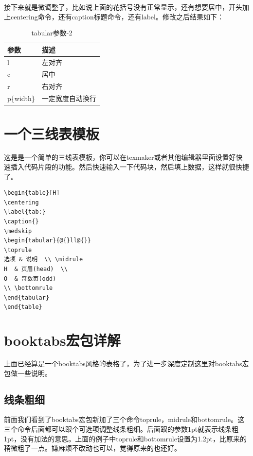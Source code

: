 \documentclass[11pt,oneside]{book}
\begin{document}
接下来就是微调整了，比如说上面的花括号没有正常显示，还有想要居中，开头加上centering命令，还有caption标题命令，还有label。修改之后结果如下：
\begin{table}[H]
\centering
\begin{tabular}{@{}ll@{}}
\toprule[1.2pt]
参数       & 描述       \\ \midrule
l        & 左对齐      \\
c        & 居中       \\
r        & 右对齐      \\
p\{width\} & 一定宽度自动换行 \\ \bottomrule[1.2pt]
\end{tabular}
\caption{tabular参数-2}
\label{tab:tabular参数-2}
\end{table}

\section{一个三线表模板}
这是是一个简单的三线表模板，你可以在texmaker或者其他编辑器里面设置好快速插入代码片段的功能。然后快速输入一下代码块，然后填上数据，这样就很快捷了。
\begin{Verbatim}
\begin{table}[H]
\centering
\label{tab:}
\caption{}
\medskip 
\begin{tabular}{@{}ll@{}}
\toprule
选项 & 说明  \\ \midrule
H  & 页眉(head)  \\
O  & 奇数页(odd) 
\\ \bottomrule
\end{tabular}
\end{table}
\end{Verbatim}


\section{booktabs宏包详解}
上面已经算是一个booktabs风格的表格了，为了进一步深度定制这里对booktabs宏包做一些说明。

\subsection{线条粗细}
前面我们看到了booktabs宏包新加了三个命令toprule，midrule和bottomrule。这三个命令后面都可以跟个可选项调整线条粗细。后面跟的参数1pt就表示线条粗1pt，没有加法的意思。上面的例子中toprule和bottomrule设置为1.2pt，比原来的稍微粗了一点。嫌麻烦不改动也可以，觉得原来的也还好。
\end{document}
